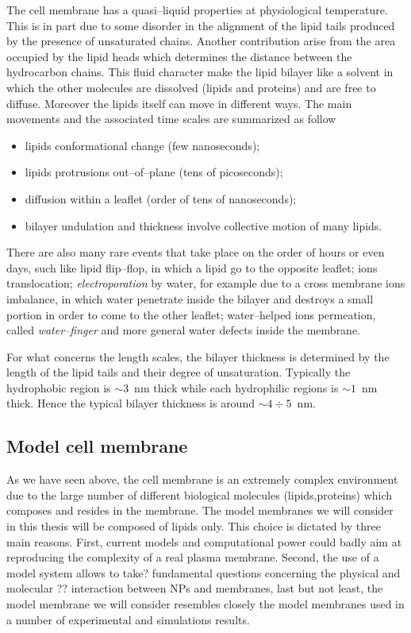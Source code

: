 The cell membrane has a quasi--liquid properties at physiological temperature. This is in part due to some disorder in the alignment of the lipid tails produced by the presence of unsaturated chains. Another contribution arise from the area occupied by the lipid heads which determines the distance between the hydrocarbon chains. This fluid character make the lipid bilayer like a solvent in which the other molecules are dissolved (lipids and proteins) and are free to diffuse. Moreover the lipids itself can move in different ways. The main movements and the associated time scales are summarized as follow
\begin{itemize}
	\item lipids conformational change (few nanoseconds);
	\item lipids protrusions out--of--plane (tens of picoseconds);
	\item diffusion within a leaflet (order of tens of nanoseconds);
	\item bilayer undulation and thickness involve collective motion of many lipids.
\end{itemize}
There are also many rare events that take place on the order of hours or even days, such like lipid flip--flop, in which a lipid go to the opposite leaflet; ions translocation; \textit{electroporation} by water, for example due to a cross membrane ions imbalance, in which water penetrate inside the bilayer and destroys a small portion in order to come to the other leaflet; water--helped ions permeation, called \textit{water--finger} and more general water defects inside the membrane.

For what concerns the length scales, the bilayer thickness is determined by the length of the lipid tails and their degree of unsaturation. Typically the hydrophobic region is $\sim 3$~nm thick while each hydrophilic regions is $\sim 1$~nm thick. Hence the typical bilayer thickness is around $\sim 4\div 5$~nm.

\subsection{Model cell membrane}
As we have seen above, the cell membrane is an extremely complex environment due to the large number of different biological molecules (lipids,proteins) which composes and resides in the membrane. The model membranes we will consider in this thesis will be composed of lipids only. This choice is dictated by three main reasons. First, current models and computational power could badly aim at reproducing the complexity of a real plasma membrane. Second, the use of a model system allows to take? fundamental questions concerning the physical and molecular  ?? interaction between \acp{NP} and membranes, last but not least, the model membrane we will consider resembles closely the model membranes used in a number of experimental and simulations results.  


